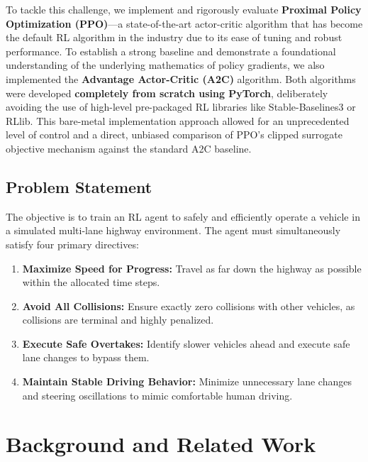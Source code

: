 \documentclass[12pt, a4paper]{article}
\begin{document}
To tackle this challenge, we implement and rigorously evaluate \textbf{Proximal Policy Optimization (PPO)}---a state-of-the-art actor-critic algorithm that has become the default RL algorithm in the industry due to its ease of tuning and robust performance. To establish a strong baseline and demonstrate a foundational understanding of the underlying mathematics of policy gradients, we also implemented the \textbf{Advantage Actor-Critic (A2C)} algorithm. Both algorithms were developed \textbf{completely from scratch using PyTorch}, deliberately avoiding the use of high-level pre-packaged RL libraries like Stable-Baselines3 or RLlib. This bare-metal implementation approach allowed for an unprecedented level of control and a direct, unbiased comparison of PPO's clipped surrogate objective mechanism against the standard A2C baseline. 

\subsection{Problem Statement}
The objective is to train an RL agent to safely and efficiently operate a vehicle in a simulated multi-lane highway environment. The agent must simultaneously satisfy four primary directives:
\begin{enumerate}
    \item \textbf{Maximize Speed for Progress:} Travel as far down the highway as possible within the allocated time steps.
    \item \textbf{Avoid All Collisions:} Ensure exactly zero collisions with other vehicles, as collisions are terminal and highly penalized.
    \item \textbf{Execute Safe Overtakes:} Identify slower vehicles ahead and execute safe lane changes to bypass them.
    \item \textbf{Maintain Stable Driving Behavior:} Minimize unnecessary lane changes and steering oscillations to mimic comfortable human driving.
\end{enumerate}

\section{Background and Related Work}
\end{document}
